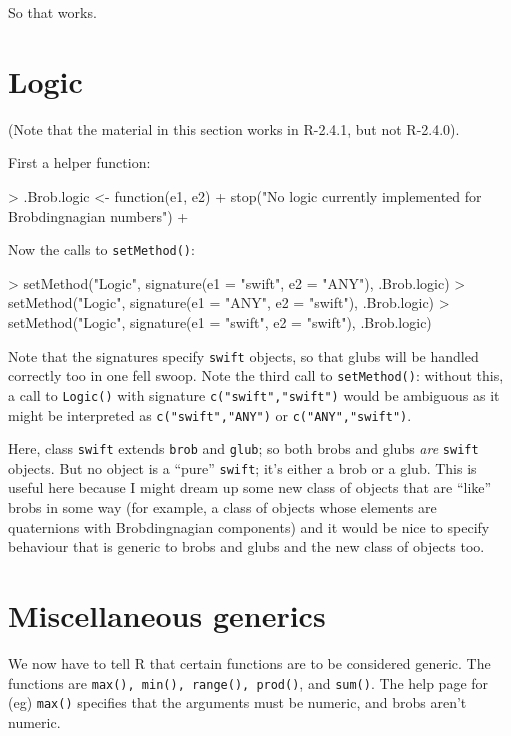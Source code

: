 \documentclass[a4paper]{article}
\begin{document}
So that works.

\section{Logic}
\label{logicSection}


(Note that the material in this section works in R-2.4.1, but not
R-2.4.0).

First a helper function:


\begin{Schunk}
\begin{Sinput}
> .Brob.logic <- function(e1, e2) {
+     stop("No logic currently implemented for Brobdingnagian numbers")
+ }
\end{Sinput}
\end{Schunk}


Now the calls to {\tt setMethod()}:


\begin{Schunk}
\begin{Sinput}
> setMethod("Logic", signature(e1 = "swift", e2 = "ANY"), .Brob.logic)
> setMethod("Logic", signature(e1 = "ANY", e2 = "swift"), .Brob.logic)
> setMethod("Logic", signature(e1 = "swift", e2 = "swift"), .Brob.logic)
\end{Sinput}
\end{Schunk}

Note that the signatures specify {\tt swift} objects, so that glubs
will be handled correctly too in one fell swoop. Note the third call
to {\tt setMethod()}: without this, a call to {\tt Logic()} with
signature {\tt c("swift","swift")} would be ambiguous as it might be
interpreted as {\tt c("swift","ANY")} or {\tt c("ANY","swift")}.

Here, class {\tt swift} extends {\tt brob} and {\tt glub}; so both
brobs and glubs {\em are} {\tt swift} objects.  But no object is a
``pure'' {\tt swift}; it's either a brob or a glub.  This is useful
here because I might dream up some new class of objects that are
``like'' brobs in some way (for example, a class of objects whose
elements are quaternions with Brobdingnagian components) and it would
be nice to specify behaviour that is generic to brobs and glubs and
the new class of objects too.




\section{Miscellaneous generics}

We now have to tell R that certain functions are to be considered
generic.  The functions are {\tt max(), min(), range(), prod()}, and
{\tt sum()}.  The help page for (eg) {\tt max()} specifies that the
arguments must be numeric, and brobs aren't numeric.
\end{document}
